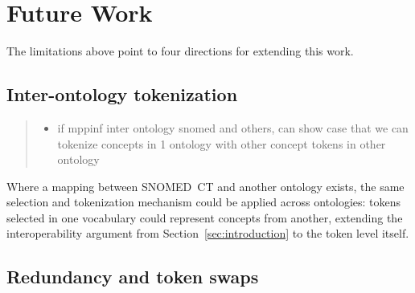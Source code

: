 \section{Future Work}
\label{sec:future-work}


The limitations above point to four directions for extending this work.

\subsection{Inter-ontology tokenization}

\begin{quote}\small\itshape
\begin{itemize}
\item if mppinf inter ontology snomed and others, can show case that we can tokenize concepts in 1 ontology with other concept tokens in other ontology
\end{itemize}
\end{quote}

Where a mapping between SNOMED~CT and another ontology exists, the same
selection and tokenization mechanism could be applied across ontologies:
tokens selected in one vocabulary could represent concepts from another,
extending the interoperability argument from Section~\ref{sec:introduction}
to the token level itself. 

\subsection{Redundancy and token swaps}


